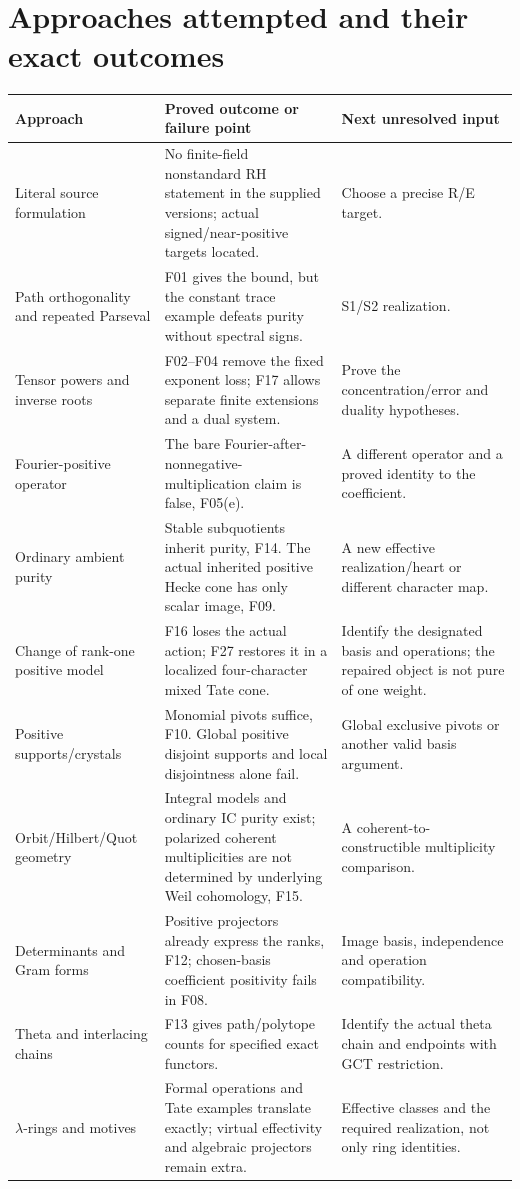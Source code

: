 \documentclass[11pt,a4paper]{article}
\theoremstyle{named}\newtheorem{finding}{Finding}[section]
\theoremstyle{definition}\newtheorem{definition}[finding]{Definition}
\theoremstyle{remark}\newtheorem{remark}[finding]{Remark}
\begin{document}
\section{Approaches attempted and their exact outcomes}
{\small\begin{longtable}{p{.23\linewidth}p{.40\linewidth}p{.29\linewidth}}
\toprule Approach&Proved outcome or failure point&Next unresolved input\\\midrule\endhead
Literal source formulation&No finite-field nonstandard RH statement in the supplied versions; actual signed/near-positive targets located.&Choose a precise R/E target.\\
Path orthogonality and repeated Parseval&F01 gives the bound, but the constant trace example defeats purity without spectral signs.&S1/S2 realization.\\
Tensor powers and inverse roots&F02--F04 remove the fixed exponent loss; F17 allows separate finite extensions and a dual system.&Prove the concentration/error and duality hypotheses.\\
Fourier-positive operator&The bare Fourier-after-nonnegative-multiplication claim is false, F05(e).&A different operator and a proved identity to the coefficient.\\
Ordinary ambient purity&Stable subquotients inherit purity, F14. The actual inherited positive Hecke cone has only scalar image, F09.&A new effective realization/heart or different character map.\\
Change of rank-one positive model&F16 loses the actual action; F27 restores it in a localized four-character mixed Tate cone.&Identify the designated basis and operations; the repaired object is not pure of one weight.\\
Positive supports/crystals&Monomial pivots suffice, F10. Global positive disjoint supports and local disjointness alone fail.&Global exclusive pivots or another valid basis argument.\\
Orbit/Hilbert/Quot geometry&Integral models and ordinary IC purity exist; polarized coherent multiplicities are not determined by underlying Weil cohomology, F15.&A coherent-to-constructible multiplicity comparison.\\
Determinants and Gram forms&Positive projectors already express the ranks, F12; chosen-basis coefficient positivity fails in F08.&Image basis, independence and operation compatibility.\\
Theta and interlacing chains&F13 gives path/polytope counts for specified exact functors.&Identify the actual theta chain and endpoints with GCT restriction.\\
$\lambda$-rings and motives&Formal operations and Tate examples translate exactly; virtual effectivity and algebraic projectors remain extra.&Effective classes and the required realization, not only ring identities.\\\bottomrule
\end{longtable}}
\end{document}
